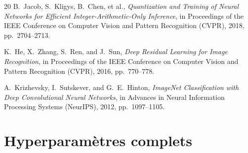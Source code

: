 \documentclass[12pt, a4paper, twoside]{report}
\begin{document}
\begin{thebibliography}{20}
B.~Jacob, S.~Kligys, B.~Chen, et al.,
\textit{Quantization and Training of Neural Networks for Efficient Integer-Arithmetic-Only Inference},
in Proceedings of the IEEE Conference on Computer Vision and Pattern Recognition (CVPR), 2018, pp.~2704--2713.

K.~He, X.~Zhang, S.~Ren, and J.~Sun,
\textit{Deep Residual Learning for Image Recognition},
in Proceedings of the IEEE Conference on Computer Vision and Pattern Recognition (CVPR), 2016, pp.~770--778.

A.~Krizhevsky, I.~Sutskever, and G.~E.~Hinton,
\textit{ImageNet Classification with Deep Convolutional Neural Networks},
in Advances in Neural Information Processing Systems (NeurIPS), 2012, pp.~1097--1105.

\end{thebibliography}


\appendix
\chapter{Hyperparamètres complets}
\label{app:hyperparams}
\end{document}
